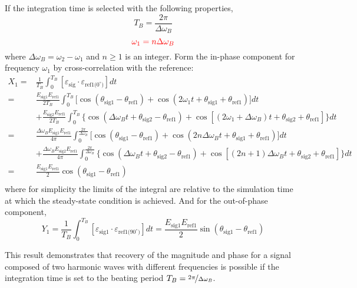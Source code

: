 If the integration time is selected with the following properties,
\[ T_B = \frac{2\pi}{\Delta\omega_B} \]
\[ {\color{red} \omega_1 = n \Delta\omega_B } \]
where $\Delta\omega_B = \omega_2 - \omega_1$ and $n \geq 1$ is an integer.
Form the in-phase component for frequency $\omega_1$ by cross-correlation
with the reference:
\begin{align*}
  X_1 = & \frac{1}{T_B} \int_0^{T_B} [ \varepsilon_\text{sig} \cdot
      \varepsilon_\text{ref1($0^\circ$)} ] dt \\
    = & \frac{E_\text{sig1} E_\text{ref1}}{2 T_B} \int_0^{T_B} \big[
      \cos(\theta_\text{sig1} - \theta_\text{ref1})
      + \cos(2\omega_1 t + \theta_\text{sig1} + \theta_\text{ref1}) \big] dt \\
    & + \frac{E_\text{sig2} E_\text{ref1}}{2 T_B} \int_0^{T_B} \big\{
      \cos(\Delta\omega_B t + \theta_\text{sig2} - \theta_\text{ref1})
      + \cos[(2\omega_1 + \Delta\omega_B) t + \theta_\text{sig2}
      + \theta_\text{ref1}] \big\} dt \\
    = & \frac{\Delta\omega_B E_\text{sig1} E_\text{ref1}}{4\pi}
      \int_0^{\frac{2\pi}{\Delta\omega_B}} \big[ \cos(\theta_\text{sig1}
      - \theta_\text{ref1}) + \cos(2n\Delta\omega_B t + \theta_\text{sig1}
      + \theta_\text{ref1}) \big] dt \\ 
    & + \frac{\Delta\omega_B E_\text{sig2} E_\text{ref1}}{4\pi}
      \int_0^{\frac{2\pi}{\Delta\omega_B}} \big\{ \cos(\Delta\omega_B t
      + \theta_\text{sig2} - \theta_\text{ref1}) + \cos[(2n + 1)\Delta\omega_B t
      + \theta_\text{sig2} + \theta_\text{ref1}] \big\} dt \\
    = & \frac{E_\text{sig1} E_\text{ref1}}{2}
      \cos(\theta_\text{sig1} - \theta_\text{ref1}) \\
\end{align*}
where for simplicity the limits of the integral are relative to
the simulation time at which the steady-state condition is achieved.
And for the out-of-phase component,
\[ Y_1 = \frac{1}{T_B} \int_0^{T_B} [ \varepsilon_\text{sig1} \cdot
  \varepsilon_\text{ref1($90^\circ$)} ] dt
  = \frac{E_\text{sig1} E_\text{ref1}}{2}
  \sin(\theta_\text{sig1} - \theta_\text{ref1}) \]

This result demonstrates that recovery of the magnitude and phase for
a signal composed of two harmonic waves with different frequencies is possible
if the integration time is set to the beating period
$T_B = \nicefrac{2\pi}{\Delta\omega_B}$.

